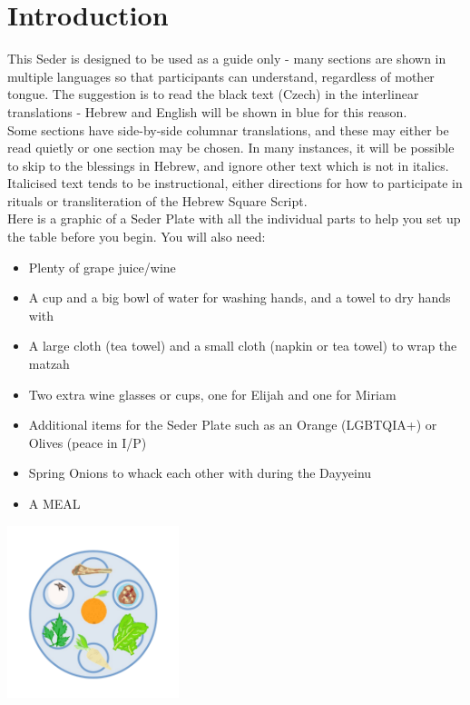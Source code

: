 \documentclass[a5paper,10pt]{memoir}
\begin{document}
\section{Introduction}
{\vspace*{-2ex} \color{midblue}This Seder is designed to be used as a guide only - many sections are shown in multiple languages so that participants can understand, regardless of mother tongue. The suggestion is to read the black text (Czech) in the interlinear translations - Hebrew and English will be shown in blue for this reason.
\vspace*{2ex}\\
Some sections have side-by-side columnar translations, and these may either be read quietly or one section may be chosen. In many instances, it will be possible to skip to the blessings in Hebrew, and ignore other text which is not in italics.
\vspace*{2ex}\\
Italicised text tends to be instructional, either directions for how to participate in rituals or transliteration of the Hebrew Square Script.
\vspace*{2ex}\\ \color{black}
Here is a graphic of a Seder Plate with all the individual parts to help you set up the table before you begin. You will also need:
\begin{itemize}
\item Plenty of grape juice/wine
\item A cup and a big bowl of water for washing hands, and a towel to dry hands with
\item A large cloth (tea towel) and a small cloth (napkin or tea towel) to wrap the matzah
\item Two extra wine glasses or cups, one for Elijah and one for Miriam
\item Additional items for the Seder Plate such as an Orange (LGBTQIA+) or Olives (peace in I/P)
\item Spring Onions to whack each other with during the Dayyeinu
\item A MEAL
\end{itemize}
}
\begin{center}
	\includegraphics[width=50mm]{Sederplate}
	\end{center}
\onecolumn
\end{document}
